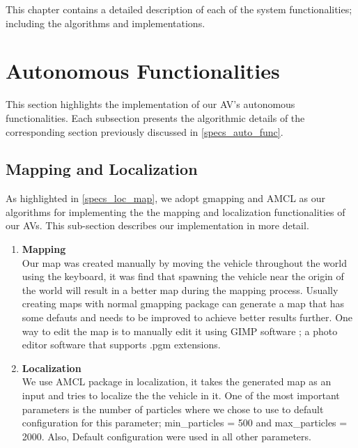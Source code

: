 This chapter contains a detailed description of each of the system functionalities; including the algorithms and implementations.
\label{chapter_methdology}



\section{Autonomous Functionalities}
\label{method_auto_func}
This section highlights the implementation of our AV's autonomous functionalities. Each subsection presents the algorithmic details of the corresponding section previously discussed in \ref{specs_auto_func}.

\subsection{Mapping and Localization}
\label{method_loc_map}
As highlighted in \ref{specs_loc_map}, we adopt gmapping and AMCL as our algorithms for implementing the the mapping and localization functionalities of our AVs. This sub-section describes our implementation in more detail.
\begin{enumerate}
\item \textbf{Mapping} 
\\ 
Our map was created manually by moving the vehicle throughout the world using the keyboard, it was find that spawning the vehicle near the origin of the world will result in a better map during the mapping process.
Usually creating maps with normal gmapping package can generate a map that has some defauts and needs to be improved to achieve better results further. One way to edit the map is to manually edit it using GIMP software \cite{gimp}; a photo editor software that supports .pgm extensions.\\
\item \textbf{Localization} 
\\
We use AMCL package in localization, it takes the generated map as an input and tries to localize the the vehicle in it. One of the most important parameters is the number of particles where we chose to use to default configuration for this parameter; min\_particles = 500 and max\_particles = 2000. Also, Default configuration were used in all other parameters.\\
\end{enumerate}

